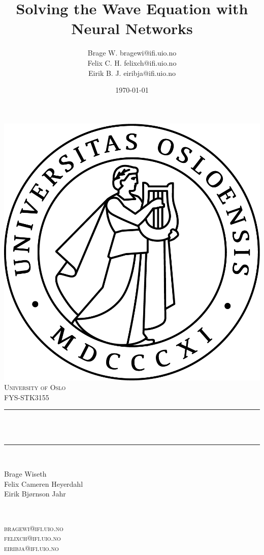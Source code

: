 \documentclass[twoside,11pt]{report}
\title{{Solving the Wave Equation with Neural Networks}}
\author{\name Brage W. \email bragewi@ifi.uio.no\\
    \name Felix C. H.  \email felixch@ifi.uio.no \\
\name Eirik B. J. \email eiribja@ifi.uio.no}
\date{\today}											%
\begin{document}

\begin{titlepage}
    \centering
    \vspace*{0.5 cm}
    \includegraphics[scale = 0.70]{uio.jpg}\\[0.2 cm]	%
    \textsc{\LARGE University of Oslo}\\[2.0 cm]	    %
    \textsc{\Large FYS-STK3155}\\[0.5 cm]				%
    \rule{\linewidth}{0.2 mm} \\[0.4 cm]
    { \huge \bfseries \@title}\\
    \rule{\linewidth}{0.2 mm} \\[1.5 cm]

    \begin{minipage}{0.4\textwidth}
        \begin{flushleft} \normalsize
            Brage Wiseth\\
            Felix Cameren Heyerdahl\\
            Eirik Bjørnson Jahr\\
        \end{flushleft}
    \end{minipage}~
    \begin{minipage}{0.4\textwidth}
        \begin{flushright} \normalsize
            \textsc{
                bragewi@ifi.uio.no\\
                felixch@ifi.uio.no\\
                eiribja@ifi.uio.no\\
            }
        \end{flushright}


\end{minipage}
\end{titlepage}
\end{document}
